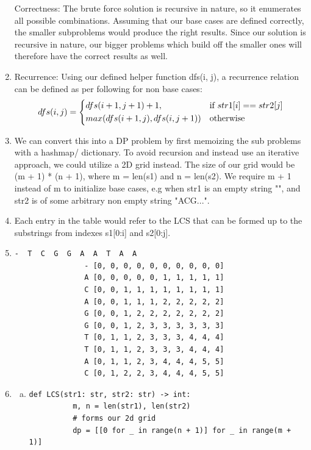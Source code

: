 \documentclass[12pt,letterpaper]{article}
\begin{document}
\begin{enumerate}
    Correctness: The brute force solution is recursive in nature, 
    so it enumerates all possible combinations.
    Assuming that our base cases are defined correctly, the smaller subproblems would produce the right results.
    Since our solution is recursive in nature, our bigger problems which build off the smaller ones 
    will therefore have the correct results as well.
  \item 
    Recurrence: Using our defined helper function dfs(i, j), 
    a recurrence relation can be defined as per following for non base cases: \\
    \[
        dfs(i, j)= 
    \begin{dcases}
        dfs(i + 1, j + 1) + 1,& \text{if } str1[i] == str2[j] \\
        max(dfs(i + 1, j), dfs(i, j +1))  & \text{otherwise}
    \end{dcases}
    \]
  \item 
    We can convert this into a DP problem by first memoizing the sub problems with a hashmap/ dictionary.
    To avoid recursion and instead use an iterative approach, we could utilize a 2D grid instead.
    The size of our grid would be (m + 1) * (n + 1), where m = len(s1) and n = len(s2).
    We require m + 1 instead of m to initialize base cases, e.g when str1 is an empty string "", and str2 is of some arbitrary non empty string "ACG...".
  \item 
    Each entry in the table would refer to the LCS that can be formed up to the substrings from indexes s1[0:i] and s2[0:j].
  \item 
            \begin{lstlisting}[style = Python]
                   -  T  C  G  G  A  A  T  A  A
                - [0, 0, 0, 0, 0, 0, 0, 0, 0, 0] 
                A [0, 0, 0, 0, 0, 1, 1, 1, 1, 1] 
                C [0, 0, 1, 1, 1, 1, 1, 1, 1, 1] 
                A [0, 0, 1, 1, 1, 2, 2, 2, 2, 2] 
                G [0, 0, 1, 2, 2, 2, 2, 2, 2, 2] 
                G [0, 0, 1, 2, 3, 3, 3, 3, 3, 3] 
                T [0, 1, 1, 2, 3, 3, 3, 4, 4, 4] 
                T [0, 1, 1, 2, 3, 3, 3, 4, 4, 4] 
                A [0, 1, 1, 2, 3, 4, 4, 4, 5, 5] 
                C [0, 1, 2, 2, 3, 4, 4, 4, 5, 5]
            \end{lstlisting}
  \item 
    \begin{enumerate}[a)]
      \item
    \begin{lstlisting}[style = Python]
      def LCS(str1: str, str2: str) -> int:
          m, n = len(str1), len(str2)
          # forms our 2d grid
          dp = [[0 for _ in range(n + 1)] for _ in range(m + 1)]


\end{lstlisting}
\end{enumerate}
\end{enumerate}
\end{document}
